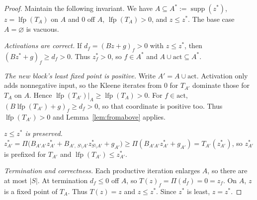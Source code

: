\documentclass{llncs}
\newcommand{\clip}{\Pi}
\begin{document}
\begin{proof}
Maintain the following invariant. We have \(A\subseteq A^\ast:=\operatorname{supp}(z^\ast)\), \(z=\operatorname{lfp}(T_A)\) on \(A\) and \(0\) off \(A\), \(\operatorname{lfp}(T_A)>0\), and \(z\le z^\ast\). The base case \(A=\varnothing\) is vacuous.

\emph{Activations are correct.} If \(d_f=(Bz+g)_f>0\) with \(z\le z^\ast\), then \((Bz^\ast+g)_f\ge d_f>0\). Thus \(z^\ast_f>0\), so \(f\in A^\ast\) and \(A\cup\mathrm{act}\subseteq A^\ast\).

\emph{The new block's least fixed point is positive.} Write \(A'=A\cup\mathrm{act}\). Activation only adds nonnegative input, so the Kleene iterates from \(0\) for \(T_{A'}\) dominate those for \(T_A\) on \(A\). Hence \(\operatorname{lfp}(T_{A'})|_A\ge\operatorname{lfp}(T_A)>0\). For \(f\in\mathrm{act}\), \((B\operatorname{lfp}(T_{A'})+g)_f\ge d_f>0\), so that coordinate is positive too. Thus \(\operatorname{lfp}(T_{A'})>0\) and Lemma~\ref{lem:fromabove} applies.

\emph{\(z\le z^\ast\) is preserved.} \(z^\ast_{A'}=\clip\!\big(B_{A'A'}z^\ast_{A'}+B_{A',\,S\setminus A'}z^\ast_{S\setminus A'}+g_{A'}\big)\ge\clip(B_{A'A'}z^\ast_{A'}+g_{A'})=T_{A'}(z^\ast_{A'})\), so \(z^\ast_{A'}\) is prefixed for \(T_{A'}\) and \(\operatorname{lfp}(T_{A'})\le z^\ast_{A'}\).

\emph{Termination and correctness.} Each productive iteration enlarges \(A\), so there are at most \(|S|\). At termination \(d_f\le0\) off \(A\), so \(T(z)_f=\clip(d_f)=0=z_f\). On \(A\), \(z\) is a fixed point of \(T_A\). Thus \(T(z)=z\) and \(z\le z^\ast\). Since \(z^\ast\) is least, \(z=z^\ast\).
\end{proof}
\end{document}
